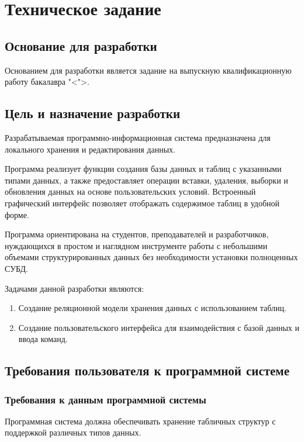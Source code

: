 \section{Техническое задание}
\subsection{Основание для разработки}

Основанием для разработки является задание на выпускную квалификационную работу бакалавра "<">.

\subsection{Цель и назначение разработки}

Разрабатываемая программно-информационная система предназначена для локального хранения и редактирования данных.

Программа реализует функции создания базы данных и таблиц с указанными типами данных, а также предоставляет операции вставки, удаления, выборки и обновления данных на основе пользовательских условий. Встроенный графический интерфейс позволяет отображать содержимое таблиц в удобной форме.

Программа ориентирована на студентов, преподавателей и разработчиков, нуждающихся в простом и наглядном инструменте работы с небольшими объемами структурированных данных без необходимости установки полноценных СУБД.

Задачами данной разработки являются:
\begin{enumerate}
\item Создание реляционной модели хранения данных с использованием таблиц.
\item Создание пользовательского интерфейса для взаимодействия с базой данных и ввода команд.
\end{enumerate}

\subsection{Требования пользователя к программной системе}

\subsubsection{Требования к данным программной системы}

Программная система должна обеспечивать хранение табличных структур с поддержкой различных типов данных.

